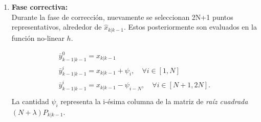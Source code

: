 \begin{enumerate}
\item \textbf{Fase correctiva:}\\
Durante la fase de correcci\'on, nuevamente se seleccionan 2N+1 puntos representativos, alrededor de $\hat{x}_{k|k-1}$. Estos posteriormente son evaluados en la funci\'on no-linear $h$.

\begin{equation}
\label{eq:eq24}
\begin{gathered}
\bar{y}_{k-1| k-1}^0 = \hat{x}_{k|k-1}\\
\bar{y}_{k-1| k-1}^i = \hat{x}_{k|k-1}+ \psi_i, \quad  \forall i \in [1, N]\\
\bar{y}_{k-1| k-1}^i = \hat{x}_{k|k-1}- \psi_{i-N}, \quad  \forall i \in [N+1, 2N].\\
\end{gathered}
\end{equation}
La cantidad $\psi_i$ representa la i-\'esima columna de la matriz de \textit{ra\'iz cuadrada} $(N+\lambda)P_{k|k-1}$.


\end{enumerate}
